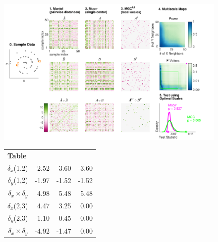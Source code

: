 \documentclass[11pt]{article}
\begin{document}
\begin{figure}[htbp]
\vspace{-50pt}
\includegraphics[width=1.0\textwidth,trim={0 0 1cm 0},clip]{Figures/FigA}
\setlength{\tabcolsep}{10pt} %
\begin{tabular}{r  r   r   r}
\multicolumn{1}{l}{\textbf{Table}} & & & \\
$\delta_x$(1,2)   & \hspace{1.5em} \color{magenta}-2.52  & \hspace{3.5em} \color{magenta}-3.60  &  \hspace{3.0em} \color{magenta}-3.60  \\ 
 $\delta_y$(1,2) & \color{magenta}-1.97 & \color{magenta}-1.52 & \color{magenta}-1.52  \\ 
 $\delta_x \times \delta_y$ & \color{green}4.98 & \color{green}5.48 & \color{green}5.48  \\ 
 
\hline

 $\delta_x$(2,3) & \color{green}4.47 & \color{green}3.25 & 0.00  \\ 
 $\delta_y$(2,3) &  \color{magenta}-1.10 & \color{magenta}-0.45 & 0.00  \\ 
 $\delta_x \times \delta_y$ & \color{magenta}-4.92 & \color{magenta}-1.47 & 0.00  \\ 


\end{tabular}
\end{figure}
\end{document}
